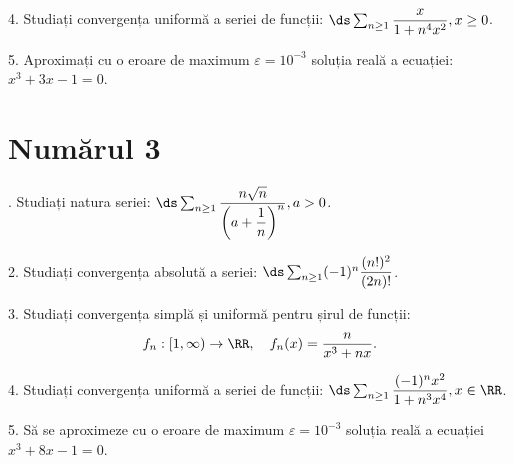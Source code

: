 \vspace{1cm}

4. Studiați convergența uniformă a seriei de funcții:
$ \ds\sum_{n \geq 1} \dfrac{x}{1 + n^4 x^2}, x \geq 0 $.

\vspace{1cm}

5. Aproximați cu o eroare de maximum $ \varepsilon = 10^{-3} $ soluția reală
a ecuației: $ x^3 + 3x - 1 = 0 $.


\section{Numărul 3}

\indent{}. Studiați natura seriei:
$ \ds\sum_{n \geq 1} \dfrac{n\sqrt{n}}{\left(a + \dfrac{1}{n} \right)^n}, a > 0 $.

\vspace{1cm}

2. Studiați convergența absolută a seriei: $ \ds\sum_{n \geq 1} (-1)^n \dfrac{(n!)^2}{(2n)!} $.

\vspace{1cm}

3. Studiați convergența simplă și uniformă pentru șirul de funcții:
\[
  f_n : [1, \infty) \to \RR, \quad f_n(x) = \dfrac{n}{x^3 + nx}.
\]

\vspace{1cm}

4. Studiați convergența uniformă a seriei de funcții:
$ \ds\sum_{n \geq 1} \dfrac{(-1)^n x^2}{1 + n^3 x^4}, x \in \RR $.

\vspace{1cm}

5. Să se aproximeze cu o eroare de maximum $ \varepsilon = 10^{-3} $ soluția
reală a ecuației $ x^3 + 8x - 1 = 0 $.



